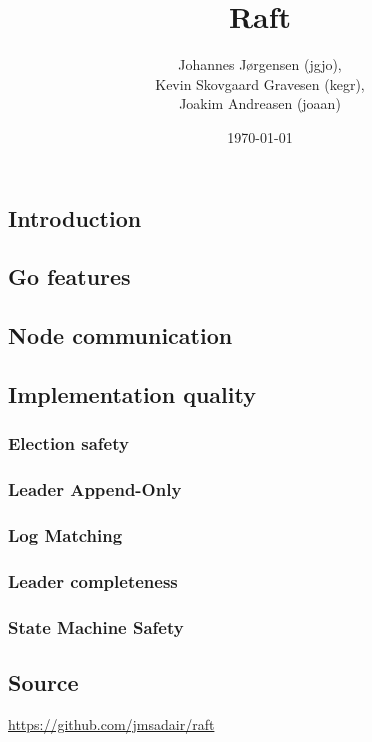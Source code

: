 \documentclass[a4paper,11pt]{article}
\title{Raft}
\author{Johannes Jørgensen (jgjo),\\ Kevin Skovgaard Gravesen (kegr),\\ Joakim Andreasen (joaan)}
\date{\today}
\begin{document}
 

\maketitle

\subsection*{Introduction}

\subsection*{Go features}

\subsection*{Node communication}

\subsection*{Implementation quality}

\subsubsection*{Election safety}

\subsubsection*{Leader Append-Only}

\subsubsection*{Log Matching}

\subsubsection*{Leader completeness}

\subsubsection*{State Machine Safety}

\subsection*{Source}
\href{https://github.com/jmsadair/raft}{https://github.com/jmsadair/raft}
\end{document}
